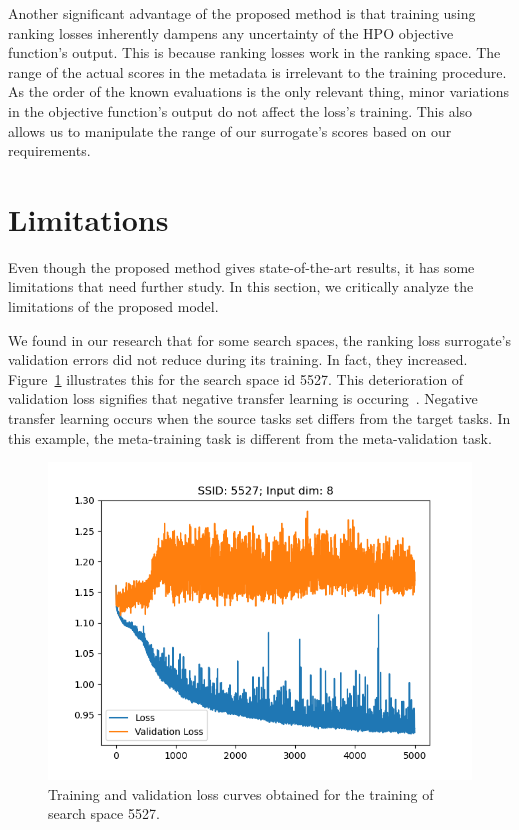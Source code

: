 \documentclass[12pt, twoside, ngerman]{report}
\begin{document}
Another significant advantage of the proposed method is that training using ranking losses inherently dampens any uncertainty of the HPO objective function's output.
This is because ranking losses work in the ranking space. The range of the actual scores in the metadata is irrelevant to the training procedure.
As the order of the known evaluations is the only relevant thing, minor variations in the objective function's output do not affect the loss's training. This also allows us to manipulate the range of our surrogate's scores based on our requirements.


\section{Limitations}
\label{sec:Limitations}
\label{sec:NegativeTransferLearning}
Even though the proposed method gives state-of-the-art results, it has some limitations that need further study. In this section, we critically analyze the limitations of the proposed model.

We found in our research that for some search spaces, the ranking loss surrogate's validation errors did not reduce during its training. In fact, they increased.
Figure~\ref{fig:NegativeLearning} illustrates this for the search space id 5527.
This deterioration of validation loss signifies that negative transfer learning is occuring~\cite{Weiss2016}.
Negative transfer learning occurs when the source tasks set differs from the target tasks. In this example, the meta-training task is different from the meta-validation task.

\begin{figure}[htb]
  \centering
    \includegraphics[scale=0.5]{images/NegativeLearning}
    \caption{Training and validation loss curves obtained for the training of search space 5527.}
    \label{fig:NegativeLearning}
\end{figure}
\end{document}
